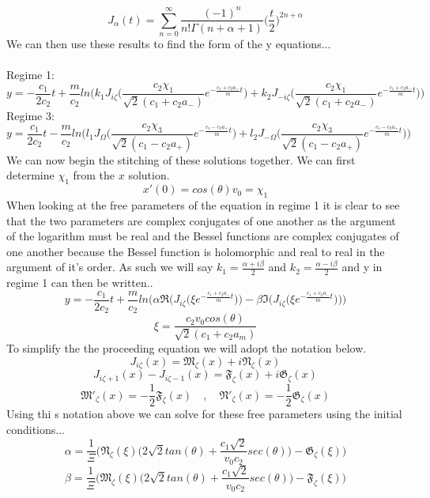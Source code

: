 \documentclass{article}
\begin{document}
$$
J_{\alpha}(t) = \sum^{\infty}_{n=0} \frac{(-1)^{n}}{n!\Gamma (n+\alpha+1)}\bigg(\frac{t}{2}\bigg)^{2n+\alpha}
$$
We can then use these results to find the form of the y equations...
\\
\\
Regime 1:
$$
y=-\frac{c_{1}}{2 c_{2}}t+\frac{m}{c_{2}}ln\bigg( k_{1}J_{i\zeta}\bigg( \frac{c_{2}\chi_{1}}{\sqrt{2}(c_{1}+c_{2}a_{-})} e^{-\frac{c_{1}+c_{2}a_{-}}{m}t} \bigg)+k_{2}J_{-i\zeta}\bigg( \frac{c_{2}\chi_{1}}{\sqrt{2}(c_{1}+c_{2}a_{-})} e^{-\frac{c_{1}+c_{2}a_{-}}{m}t} \bigg) \bigg)
$$
Regime 3:
$$
y=\frac{c_{1}}{2 c_{2}}t-\frac{m}{c_{2}}ln\bigg(l_{1}J_{\Omega}\bigg( \frac{c_{2}\chi_{3}}{\sqrt{2}(c_{1}-c_{2}a_{+})} e^{-\frac{c_{1}-c_{2}a_{+}}{m}t} \bigg)+l_{2}J_{-\Omega}\bigg( \frac{c_{2}\chi_{3}}{\sqrt{2}(c_{1}-c_{2}a_{+})} e^{-\frac{c_{1}-c_{2}a_{+}}{m}t} \bigg)\bigg)
$$
We can now begin the stitching of these solutions together. We can first determine $\chi_{1}$ from the $x$ solution.
$$
x'(0) = cos(\theta)v_{0} = \chi_{1}
$$
When looking at the free parameters of the equation in regime 1 it is clear to see that the two parameters are complex conjugates of one another as the argument of the logarithm must be real and the Bessel functions are complex conjugates of one another because the Bessel function is holomorphic and real to real in the argument of it's order. As such we will say $k_{1}=\frac{\alpha +i\beta}{2}$ and $k_{2}=\frac{\alpha -i\beta}{2}$ and y in regime 1 can then be written..
$$
y = -\frac{c_{1}}{2c_{2}}t+\frac{m}{c_{2}}ln \bigg( \alpha \Re \bigg( J_{i\zeta}\bigg( \xi e^{-\frac{c_{1}+c_{2}a_{-}}{m}t} \bigg) \bigg) -\beta \Im \bigg( J_{i\zeta}\bigg( \xi e^{-\frac{c_{1}+c_{2}a_{-}}{m}t} \bigg) \bigg)\bigg)
$$
$$
\xi = \frac{c_{2}v_{0}cos(\theta)}{\sqrt{2}(c_{1}+c_{2}a_{m})}
$$
To simplify the the proceeding equation we will adopt the notation below.
$$
J_{i\zeta}(x) = \mathfrak{M}_{\zeta}(x)+i\mathfrak{N}_{\zeta}(x)
$$
$$
J_{i\zeta+1}(x)-J_{i\zeta-1}(x) = \mathfrak{F}_{\zeta}(x)+i\mathfrak{G}_{\zeta}(x)
$$
$$
\mathfrak{M}'_{\zeta}(x) = -\frac{1}{2}\mathfrak{F}_{\zeta}(x) \quad , \quad \mathfrak{N}'_{\zeta}(x) = -\frac{1}{2}\mathfrak{G}_{\zeta}(x)
$$
Using thi
s notation above we can solve for these free parameters using the initial conditions...
$$
\alpha = \frac{1}{\Xi}\bigg(\mathfrak{N}_{\zeta}(\xi)\bigg(2\sqrt{2}tan(\theta)+ \frac{c_{1}\sqrt{2}}{v_{0}c_{2}}sec(\theta)\bigg)-\mathfrak{G}_{\zeta}(\xi) \bigg)
$$
$$
\beta =  \frac{1}{\Xi}\bigg(\mathfrak{M}_{\zeta}(\xi)\bigg(2\sqrt{2}tan(\theta)+ \frac{c_{1}\sqrt{2}}{v_{0}c_{2}}sec(\theta)\bigg)-\mathfrak{F}_{\zeta}(\xi) \bigg)
$$
\end{document}
